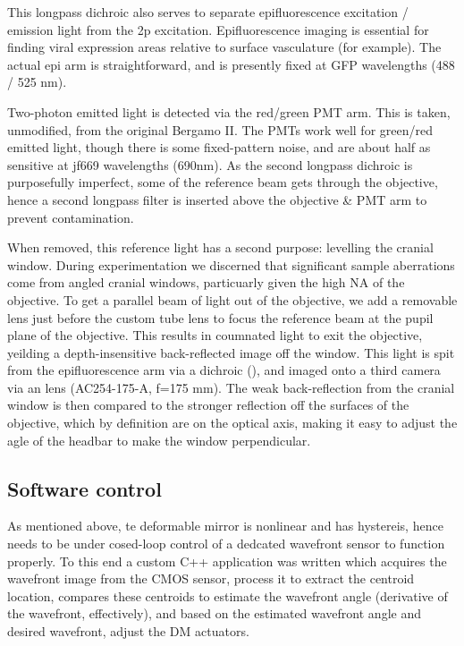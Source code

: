 \documentclass[a4paper,10pt]{article}
\begin{document}
This longpass dichroic also serves to separate epifluorescence excitation / emission light from the 2p excitation.  Epifluorescence imaging is essential for finding viral expression areas relative to surface vasculature (for example).  The actual epi arm is straightforward, and is presently fixed at GFP wavelengths (488 / 525 nm).  

Two-photon emitted light is detected via the red/green PMT arm.  This is taken, unmodified, from the original Bergamo II.  The PMTs work well for green/red emitted light, though there is some fixed-pattern noise, and are about half as sensitive at jf669 wavelengths (690nm).  As the second longpass dichroic is purposefully imperfect, some of the reference beam gets through the objective, hence a second longpass filter is inserted above the objective \& PMT arm to prevent contamination.  

When removed, this reference light has a second purpose: levelling the cranial window.  During experimentation we discerned that significant sample aberrations come from angled cranial windows, particuarly given the high NA of the objective.  To get a parallel beam of light out of the objective, we add a removable lens just before the custom tube lens to focus the reference beam at the pupil plane of the objective.  This results in coumnated light to exit the objective, yeilding a depth-insensitive back-reflected image off the window.  This light is spit from the epifluorescence arm via a dichroic (), and imaged onto a third camera via an lens (AC254-175-A, f=175 mm).  The weak back-reflection from the cranial window is then compared to the stronger reflection off the surfaces of the objective, which by definition are on the optical axis, making it easy to adjust the agle of the headbar to make the window perpendicular.  

\subsection{Software control}

As mentioned above, te deformable mirror is nonlinear and has hystereis, hence needs to be under cosed-loop control of a dedcated wavefront sensor to function properly.  To this end a custom C++ application was written which acquires the wavefront image from the CMOS sensor, process it to extract the centroid location, compares these centroids to estimate the wavefront angle (derivative of the wavefront, effectively), and based on the estimated wavefront angle and desired wavefront, adjust the DM actuators.  
\end{document}
